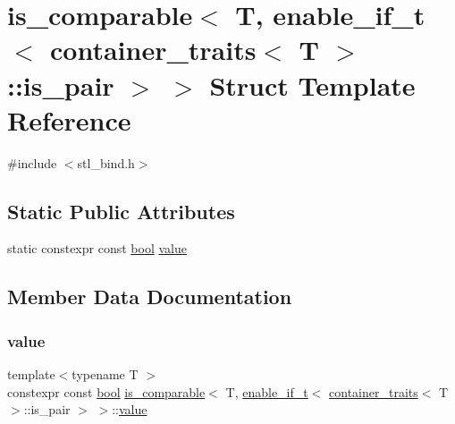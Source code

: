 \hypertarget{structis__comparable_3_01_t_00_01enable__if__t_3_01container__traits_3_01_t_01_4_1_1is__pair_01_4_01_4}{}\section{is\+\_\+comparable$<$ T, enable\+\_\+if\+\_\+t$<$ container\+\_\+traits$<$ T $>$\+::is\+\_\+pair $>$ $>$ Struct Template Reference}
\label{structis__comparable_3_01_t_00_01enable__if__t_3_01container__traits_3_01_t_01_4_1_1is__pair_01_4_01_4}


{\ttfamily \#include $<$stl\+\_\+bind.\+h$>$}

\subsection*{Static Public Attributes}
\begin{DoxyCompactItemize}
\item 
static constexpr const \mbox{\hyperlink{asdl_8h_af6a258d8f3ee5206d682d799316314b1}{bool}} \mbox{\hyperlink{structis__comparable_3_01_t_00_01enable__if__t_3_01container__traits_3_01_t_01_4_1_1is__pair_01_4_01_4_a90d507cec58be068772f149f4d40e9a0}{value}}
\end{DoxyCompactItemize}


\subsection{Member Data Documentation}
\mbox{\label{structis__comparable_3_01_t_00_01enable__if__t_3_01container__traits_3_01_t_01_4_1_1is__pair_01_4_01_4_a90d507cec58be068772f149f4d40e9a0}} 
\subsubsection{\texorpdfstring{value}{value}}
{\footnotesize\ttfamily template$<$typename T $>$ \\
constexpr const \mbox{\hyperlink{asdl_8h_af6a258d8f3ee5206d682d799316314b1}{bool}} \mbox{\hyperlink{structis__comparable}{is\+\_\+comparable}}$<$ T, \mbox{\hyperlink{detail_2common_8h_a012819c9e8b5e04872a271f50f8b8196}{enable\+\_\+if\+\_\+t}}$<$ \mbox{\hyperlink{structcontainer__traits}{container\+\_\+traits}}$<$ T $>$\+::is\+\_\+pair $>$ $>$\+::\mbox{\hyperlink{_s_d_l__opengl__glext_8h_a8ad81492d410ff2ac11f754f4042150f}{value}}\hspace{0.3cm}{\ttfamily [static]}}

